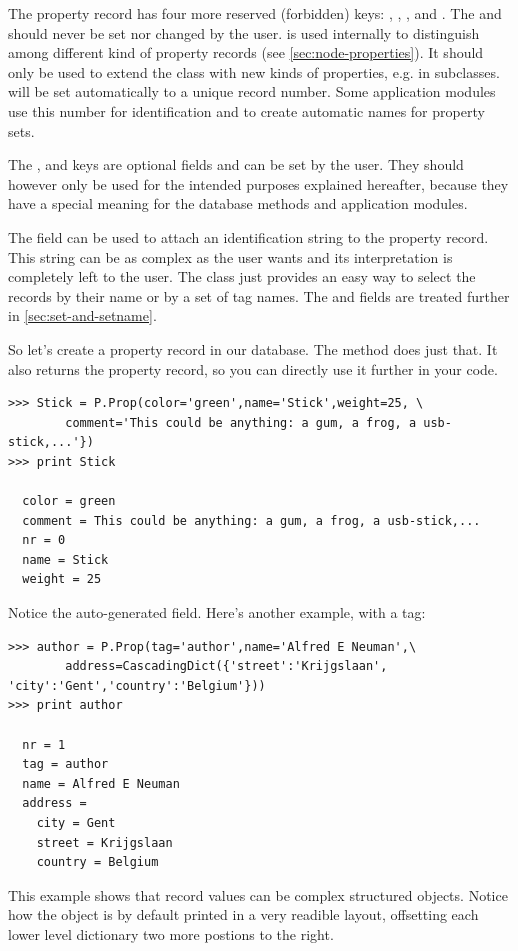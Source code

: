 The property record has four more reserved (forbidden) keys: , , ,  and . The  and  should never be set nor changed by the user.  is used internally to distinguish among different kind of property records (see \ref{sec:node-properties}). It should only be used to extend the  class with new kinds of properties, e.g. in subclasses.  will be set automatically to a unique record number. Some application modules use this number for identification and to create automatic names for property sets. 

The ,  and  keys are optional fields and can be set by the user. They should however only be used for the intended purposes explained hereafter, because they have a special meaning for the database methods and application modules.

The  field can be used to attach an identification string to the property record. This string can be as complex as the user wants and its interpretation is completely left to the user. The  class just provides an easy way to select the records by their  name or by a set of tag names. The  and  fields are treated further in \ref{sec:set-and-setname}.

So let's create a property record in our database. The  method does just that. It also returns the property record, so you can directly use it further in your code.
\begin{verbatim}
>>> Stick = P.Prop(color='green',name='Stick',weight=25, \
        comment='This could be anything: a gum, a frog, a usb-stick,...'})
>>> print Stick

  color = green
  comment = This could be anything: a gum, a frog, a usb-stick,...
  nr = 0
  name = Stick
  weight = 25
\end{verbatim}
Notice the auto-generated  field. Here's another example, with a tag:
\begin{verbatim}
>>> author = P.Prop(tag='author',name='Alfred E Neuman',\
        address=CascadingDict({'street':'Krijgslaan', 'city':'Gent','country':'Belgium'}))
>>> print author

  nr = 1
  tag = author
  name = Alfred E Neuman
  address = 
    city = Gent
    street = Krijgslaan
    country = Belgium
\end{verbatim}
This example shows that record values can be complex structured objects.
Notice how the  object is by default printed in a very readible layout, offsetting each lower level dictionary two more postions to the right. 

